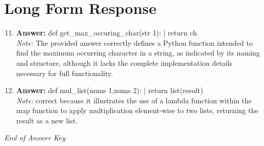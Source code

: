 \documentclass[12pt]{article}
\begin{document}
\section*{Long Form Response}
\begin{enumerate}[label=\arabic*.]
\setcounter{enumi}{10}
\item \textbf{Answer:} def get\_max\_occuring\_char(str 1): | return ch
\\ \textit{Note:} The provided answer correctly defines a Python function intended to find the maximum occurring character in a string, as indicated by its naming and structure, although it lacks the complete implementation details necessary for full functionality.
\item \textbf{Answer:} def mul\_list(nums 1,nums 2): | return list(result)
\\ \textit{Note:} correct because it illustrates the use of a lambda function within the map function to apply multiplication element-wise to two lists, returning the result as a new list.
\end{enumerate}

\vfill
\noindent\textit{End of Answer Key}
\end{document}
